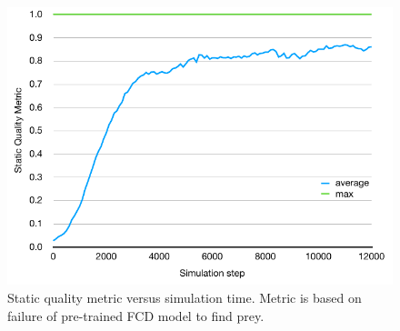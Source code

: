 \documentclass[letterpaper]{article}
\begin{document}


\begin{figure}
    \includegraphics[width=\columnwidth]{sqm_plot.pdf}
    \caption{Static quality metric versus simulation time. Metric is based on failure of pre-trained FCD model to find prey.}
    \label{fig:sqm_plot}
\end{figure}


\end{document}
